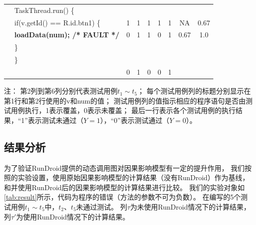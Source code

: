 \begin{table}[!hb]
\begin{center}
\begin{tabular}{|rl*{5} {|c}|c|c|}
			&TaskThread.run() \{                             &   &   &   &   &   &      &       \\
			
			&\quad if(v.getId() == R.id.btn1) \{                          & 1 & 1 & 1 & 1 & 1 &  NA   & 0.67 \\
			
			&\quad \quad \textbf{loadData(num); /* FAULT */} & 0 & 1 & 1 & 0 & 1 & 0.67    & 1.0  \\
			
			&\quad\}                                         &   &   &   &   &   &  &                \\
			
			&\}                                              &   &   &   &   &   &   &              \\
			
			\hline
			
			&                                                  & 0 & 1 & 0 & 0 & 1 &   &               \\
									\hline
		\end{tabular}
	\end{center}
\tiny
	注： 第2列到第6列分别代表测试用例$t_1\sim t_5$；
	每个测试用例列的标题分别显示在第1行和第2行使用的v和num的值；
	测试用例列的值指示相应的程序语句是否由测试用例执行，1表示覆盖，0表示未覆盖；   
	最后一行表示各个测试用例的执行结果，“1”表示测试未通过（$Y=1$），“0”表示测试通过（$Y=0$）。  \par
	
	
\end{table}


\subsection{结果分析}


为了验证RunDroid提供的动态调用图对因果影响模型有一定的提升作用，
我们按照\cite{baah2010causal,baah2011mitigating}的实验设置，使用原始因果影响模型的计算结果（没有RunDroid）作为基线，和并使用RunDroid后的因果影响模型的计算结果进行比较。
我们的实验对象如\autoref{tab:result}所示，代码为程序的错误（方法的参数不可为负数）。
在编写的5个测试用例$t_1\sim t_5$中，$t_2$、$ t_5$未通过测试。
列$\tau$为未使用RunDroid情况下的计算结果，列$\tau'$为使用RunDroid情况下的计算结果。


